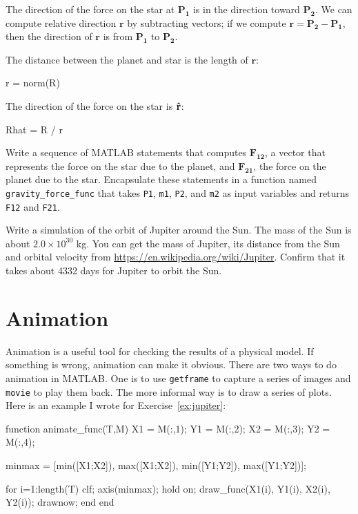 \documentclass[
]{book}
\numberwithin{Answer}{chapter}
\numberwithin{Exercise}{chapter}
\renewcommand{\vec}[1]{\bm{\mathbf{#1}}}
\newcommand{\uveci}{{\bm{\hat{\textnormal{\bfseries\i}}}}}
\newcommand{\uvecj}{{\bm{\hat{\textnormal{\bfseries\j}}}}}
\newcommand{\uvec}[1]{%
    \ifthenelse{\equal{#1}{i}}%
        {\uveci}{%
    \ifthenelse{\equal{#1}{j}}%
        {\uvecj}{%
    {\bm{\hat{\mathbf{#1}}}}%
}}}
\begin{document}
The direction of the force on the star at $\vec{P_1}$ is in the
direction toward $\vec{P_2}$.  We can compute relative direction $\vec{r}$ by
subtracting vectors; if we compute $\vec{r} = \vec{P_2} - \vec{P_1}$, then
the direction of $\vec{r}$ is from $\vec{P_1}$ to $\vec{P_2}$.

The distance between the planet and star is the length of $\vec{r}$:

\begin{code}
r = norm(R)
\end{code}

The direction of the force on the star is $\uvec{r}$:

\begin{code}
Rhat = R / r
\end{code}

\begin{ex}
Write a sequence of MATLAB statements that computes $\vec{F_{12}}$, a vector
that represents the force on the star due to the planet, and
$\vec{F_{21}}$, the force on the planet due to the star. Encapsulate
these statements in a function named {\tt gravity\_force\_func} that
takes {\tt P1}, {\tt m1}, {\tt P2}, and {\tt m2} as input variables
and returns {\tt F12} and {\tt F21}.
\end{ex}

\begin{ex}
\label{ex:jupiter}
Write a simulation of the orbit of Jupiter around the Sun.  The mass
of the Sun is about $2.0 \times 10^{30}$ kg.  You can get the mass of
Jupiter, its distance from the Sun and orbital velocity from
\url{https://en.wikipedia.org/wiki/Jupiter}.  Confirm that it takes
about 4332 days for Jupiter to orbit the Sun.
\end{ex}

\section{Animation}

Animation is a useful tool for checking the results of a physical
model.  If something is wrong, animation can make it obvious.
There are two ways to do animation in MATLAB.  One is to use
{\tt getframe} to capture a series of images and {\tt movie} to
play them back.
The more informal way is to draw a series of plots.
Here is an example I wrote for Exercise~\ref{ex:jupiter}:

\begin{code}
function animate_func(T,M)
    X1 = M(:,1);
    Y1 = M(:,2);
    X2 = M(:,3);
    Y2 = M(:,4);

    minmax = [min([X1;X2]), max([X1;X2]), min([Y1;Y2]), max([Y1;Y2])];

    for i=1:length(T)
        clf;
        axis(minmax);
        hold on;
        draw_func(X1(i), Y1(i), X2(i), Y2(i));
        drawnow;
    end
end
\end{code}
\end{document}
